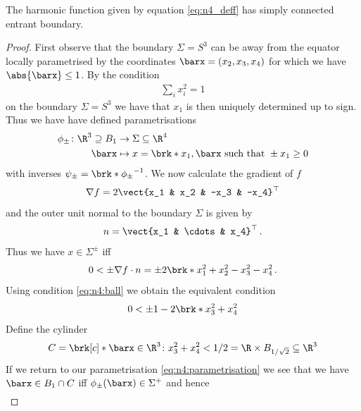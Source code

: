 \begin{proposition}\label{pr:n4_connectedBd}
  The harmonic function given by equation \eqref{eq:n4_deff} has simply connected entrant boundary.
\end{proposition}
\begin{proof}
  First observe that the boundary $\Sigma=S^3$ can be away from the equator locally parametrised by the coordinates $\barx = (x_2,x_3,x_4)$
  for which we have $\abs{\barx}\leq 1$. By the condition
  \begin{align}
    \sum_i x_i^2 = 1\label{eq:n4:ball}
  \end{align}
  on the boundary $\Sigma=S^3$ we have that $x_1$ is then uniquely determined up to sign.
  Thus we have have defined parametrisations
  \begin{align}
    \begin{aligned}\phi_\pm\colon \R^3\supseteq B_1&\to \Sigma\subseteq\R^4 \\
    \barx&\mapsto x=\brk*{x_1,\barx}\text{ such that } \pm x_1\geq0
    \end{aligned}\label{eq:n4:parametrisation}
  \end{align}
  with inverses $\psi_\pm = \brk*{\phi_\pm}^{-1}$.
  We now calculate the gradient of $f$
  \begin{align*}
    \nabla f = 2\vect{x_1 & x_2 & -x_3 & -x_4}^\top
  \end{align*}
  and the outer unit normal to the boundary $\Sigma$ is given by
  \begin{align*}
    n = \vect{x_1 & \cdots & x_4}^\top\,.
  \end{align*}
  Thus we have $x\in\Sigma^\pm$ iff
  \begin{align*}
    0<\pm \nabla f\cdot n = \pm 2\brk*{x_1^2+x_2^2-x_3^2-x_4^2}\,.
  \end{align*}
  Using condition \eqref{eq:n4:ball} we obtain the equivalent condition
  \begin{align*}
    0<\pm 1-2\brk*{x_3^2+x_4^2}
  \end{align*}
  Define the cylinder
  \begin{align*}
    C = \brk[c]*{\barx\in \R^3\colon x_3^2+x_4^2<1/2} = \R\times B_{1/\sqrt{2}}\subseteq\R^3
  \end{align*}
  If we return to our parametrisation \eqref{eq:n4:parametrisation} we see that we have $\barx\in B_1\cap C$ iff
  $\phi_\pm(\barx)\in \Sigma^+$ and hence 
  \begin{align*}

\end{align*}
\end{proof}
